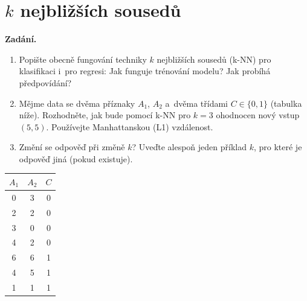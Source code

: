 \section{$k$ nejbližších sousedů}

\noindent\textbf{Zadání.}\par
\begin{enumerate}
  \item Popište obecně fungování techniky $k$ nejbližších sousedů (k-NN) pro klasifikaci i~pro regresi: Jak funguje trénování modelu? Jak probíhá předpovídání?
  \item Mějme data se dvěma příznaky $A_1$, $A_2$ a~dvěma třídami $C \in \{0,1\}$ (tabulka níže). Rozhodněte, jak bude pomocí k-NN pro $k=3$ ohodnocen nový vstup $(5,5)$. Používejte Manhattanskou (L1) vzdálenost.
  \item Změní se odpověď při změně $k$? Uveďte alespoň jeden příklad $k$, pro které je odpověď jiná (pokud existuje).
\end{enumerate}

\begin{center}
\begin{tabular}{ccc}
\toprule
$A_1$ & $A_2$ & $C$ \\
\midrule
0 & 3 & 0 \\
2 & 2 & 0 \\
3 & 0 & 0 \\
4 & 2 & 0 \\
6 & 6 & 1 \\
4 & 5 & 1 \\
1 & 1 & 1 \\
\bottomrule
\end{tabular}
\end{center}


